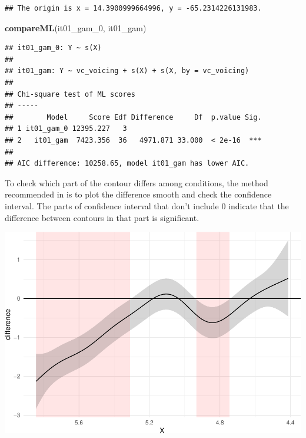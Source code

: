 \documentclass[12pt,]{article}
\newenvironment{Shaded}{\begin{snugshade}}{\end{snugshade}}
\newcommand{\DecValTok}[1]{\textcolor[rgb]{0.00,0.00,0.81}{#1}}
\newcommand{\KeywordTok}[1]{\textcolor[rgb]{0.13,0.29,0.53}{\textbf{#1}}}
\newcommand{\NormalTok}[1]{#1}
\begin{document}
\begin{verbatim}
## The origin is x = 14.3900999664996, y = -65.2314226131983.
\end{verbatim}

\begin{Shaded}
\begin{Highlighting}[]
\KeywordTok{compareML}\NormalTok{(it01_gam_}\DecValTok{0}\NormalTok{, it01_gam)}
\end{Highlighting}
\end{Shaded}

\begin{verbatim}
## it01_gam_0: Y ~ s(X)
## 
## it01_gam: Y ~ vc_voicing + s(X) + s(X, by = vc_voicing)
## 
## Chi-square test of ML scores
## -----
##        Model     Score Edf Difference     Df  p.value Sig.
## 1 it01_gam_0 12395.227   3                                
## 2   it01_gam  7423.356  36   4971.871 33.000  < 2e-16  ***
## 
## AIC difference: 10258.65, model it01_gam has lower AIC.
\end{verbatim}

To check which part of the contour differs among conditions, the method
recommended in \citet{soskuthy2017} is to plot the difference smooth and
check the confidence interval. The parts of confidence interval that
don't include 0 indicate that the difference between contours in that
part is significant.

\begin{center}\includegraphics{2018-polar-gam_files/figure-latex/diff-it01-a-1} \end{center}
\end{document}
